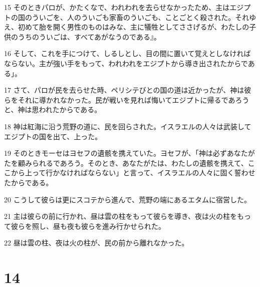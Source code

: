 \par 15 そのときパロが、かたくなで、われわれを去らせなかったため、主はエジプトの国のういごを、人のういごも家畜のういごも、ことごとく殺された。それゆえ、初めて胎を開く男性のものはみな、主に犠牲としてささげるが、わたしの子供のうちのういごは、すべてあがなうのである』。
\par 16 そして、これを手につけて、しるしとし、目の間に置いて覚えとしなければならない。主が強い手をもって、われわれをエジプトから導き出されたからである」。
\par 17 さて、パロが民を去らせた時、ペリシテびとの国の道は近かったが、神は彼らをそれに導かれなかった。民が戦いを見れば悔いてエジプトに帰るであろうと、神は思われたからである。
\par 18 神は紅海に沿う荒野の道に、民を回らされた。イスラエルの人々は武装してエジプトの国を出て、上った。
\par 19 そのときモーセはヨセフの遺骸を携えていた。ヨセフが、「神は必ずあなたがたを顧みられるであろう。そのとき、あなたがたは、わたしの遺骸を携えて、ここから上って行かなければならない」と言って、イスラエルの人々に固く誓わせたからである。
\par 20 こうして彼らは更にスコテから進んで、荒野の端にあるエタムに宿営した。
\par 21 主は彼らの前に行かれ、昼は雲の柱をもって彼らを導き、夜は火の柱をもって彼らを照し、昼も夜も彼らを進み行かせられた。
\par 22 昼は雲の柱、夜は火の柱が、民の前から離れなかった。

\chapter{14}

